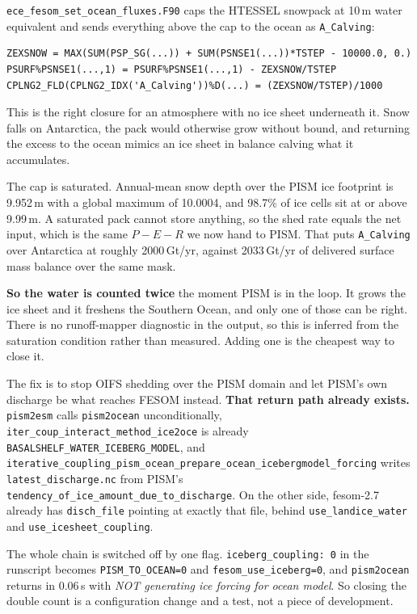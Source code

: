 \documentclass[11pt,a4paper]{article}
\newcommand{\code}[1]{\texttt{\small #1}}
\begin{document}
\code{ece\_fesom\_set\_ocean\_fluxes.F90} caps the HTESSEL snowpack at 10\,m water
equivalent and sends everything above the cap to the ocean as \code{A\_Calving}:

\begin{verbatim}
ZEXSNOW = MAX(SUM(PSP_SG(...)) + SUM(PSNSE1(...))*TSTEP - 10000.0, 0.)
PSURF%PSNSE1(...,1) = PSURF%PSNSE1(...,1) - ZEXSNOW/TSTEP
CPLNG2_FLD(CPLNG2_IDX('A_Calving'))%D(...) = (ZEXSNOW/TSTEP)/1000
\end{verbatim}

\noindent
This is the right closure for an atmosphere with no ice sheet underneath it. Snow falls on
Antarctica, the pack would otherwise grow without bound, and returning the excess to the ocean
mimics an ice sheet in balance calving what it accumulates.

The cap is saturated. Annual-mean snow depth over the PISM ice footprint is 9.952\,m with a global
maximum of 10.0004, and 98.7\% of ice cells sit at or above 9.99\,m. A saturated pack cannot store
anything, so the shed rate equals the net input, which is the same $P-E-R$ we now hand to PISM.
That puts \code{A\_Calving} over Antarctica at roughly 2000\,Gt/yr, against 2033\,Gt/yr of
delivered surface mass balance over the same mask.

\medskip\noindent
\textbf{So the water is counted twice} the moment PISM is in the loop. It grows the ice sheet and
it freshens the Southern Ocean, and only one of those can be right. There is no runoff-mapper
diagnostic in the output, so this is inferred from the saturation condition rather than measured.
Adding one is the cheapest way to close it.

The fix is to stop OIFS shedding over the PISM domain and let PISM's own discharge be what reaches
FESOM instead. \textbf{That return path already exists.} \code{pism2esm} calls \code{pism2ocean}
unconditionally, \code{iter\_coup\_interact\_method\_ice2oce} is already
\code{BASALSHELF\_WATER\_ICEBERG\_MODEL}, and
\code{iterative\_coupling\_pism\_ocean\_prepare\_ocean\_icebergmodel\_forcing} writes
\code{latest\_discharge.nc} from PISM's \code{tendency\_of\_ice\_amount\_due\_to\_discharge}. On the
other side, fesom-2.7 already has \code{disch\_file} pointing at exactly that file, behind
\code{use\_landice\_water} and \code{use\_icesheet\_coupling}.

The whole chain is switched off by one flag. \code{iceberg\_coupling: 0} in the runscript becomes
\code{PISM\_TO\_OCEAN=0} and \code{fesom\_use\_iceberg=0}, and \code{pism2ocean} returns in 0.06\,s
with \emph{NOT generating ice forcing for ocean model}. So closing the double count is a
configuration change and a test, not a piece of development.
\end{document}
